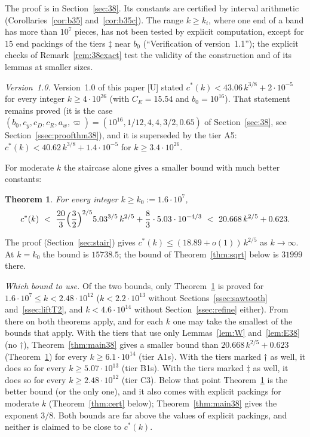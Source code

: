\documentclass[11pt]{amsart}
\newcommand{\cs}{c^{*}}
\newtheorem{theorem}{Theorem}[section]
\theoremstyle{definition}
\theoremstyle{remark}
\numberwithin{equation}{section}
\begin{document}
The proof is in Section~\ref{sec:38}. Its constants are certified by interval arithmetic (Corollaries~\ref{cor:b35} and~\ref{cor:b35c}).
The range $k\ge k_i$, where one end of a band has more than $10^{7}$ pieces, has not been tested by explicit
computation, except for $15$ end packings of the tiers $\ddagger$ near $b_0$ (``Verification of version~1.1''); the
explicit checks of Remark~\ref{rem:38exact} test the validity of the construction and of its lemmas at smaller sizes.

\emph{Version~1.0.} Version~1.0 of this paper [U] stated $\cs(k)<43.06\,k^{3/8}+2\cdot10^{-5}$ for every integer
$k\ge4\cdot10^{26}$ (with $C_E=15.54$ and $b_0=10^{16}$). That statement remains proved (it is the case
$(b_0,c_y,c_D,c_R,a_w,\varpi)=(10^{16},1/12,4,4,3/2,0.65)$ of Section~\ref{sec:38}, see
Section~\ref{ssec:proofthm38}), and it is superseded by the tier A5: $\cs(k)<40.62\,k^{3/8}+1.4\cdot10^{-5}$ for
$k\ge3.4\cdot10^{26}$.

For moderate $k$ the staircase alone gives a smaller bound with much better constants:

\begin{theorem}\label{thm:main}
For every integer $k\ge k_0:=1.6\cdot10^7$,
\[
\cs(k)\ <\ \frac{20}{3}\Bigl(\frac32\Bigr)^{2/5}5.03^{3/5}\,k^{2/5}+\frac83\cdot5.03\cdot10^{-4/3}
\ <\ 20.668\,k^{2/5}+0.623 .
\]
\end{theorem}

The proof (Section~\ref{sec:stair}) gives $\cs(k)\le(18.89+o(1))\,k^{2/5}$ as $k\to\infty$. At $k=k_0$ the bound is
$15738.5$; the bound of Theorem~\ref{thm:sqrt} below is $31999$ there.

\emph{Which bound to use.} Of the two bounds, only Theorem~\ref{thm:main} is proved for $1.6\cdot10^7\le k<2.48\cdot10^{12}$
($k<2.2\cdot10^{13}$ without Sections~\ref{ssec:sawtooth} and~\ref{ssec:liftT2}, and $k<4.6\cdot10^{14}$ without
Section~\ref{ssec:refine} either).
From there on both theorems apply, and for each $k$ one may take the smallest of the bounds that apply.
With the tiers that use only Lemmas~\ref{lem:W} and~\ref{lem:E38} (no $\dagger$), Theorem~\ref{thm:main38} gives
a smaller bound than $20.668\,k^{2/5}+0.623$ (Theorem~\ref{thm:main}) for every $k\ge6.1\cdot10^{14}$ (tier A1s). With
the tiers marked $\dagger$
as well, it does so for every $k\ge5.07\cdot10^{13}$ (tier B1s).
With the tiers marked $\ddagger$ as well, it does so for every $k\ge2.48\cdot10^{12}$ (tier C3).
Below that point Theorem~\ref{thm:main} is the better bound (or the only one), and it also comes with explicit packings
for moderate $k$ (Theorem~\ref{thm:cert} below); Theorem~\ref{thm:main38} gives the exponent $3/8$. Both bounds are
far above the values of explicit packings, and neither is claimed to be close to $\cs(k)$.
\end{document}
